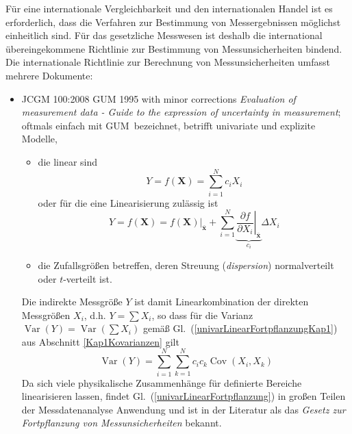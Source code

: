 Für eine internationale Vergleichbarkeit und den internationalen Handel ist es erforderlich,
dass die Verfahren zur Bestimmung von Messergebnissen möglichst einheitlich sind.
Für das gesetzliche Messwesen ist deshalb die international übereingekommene Richtlinie
zur Bestimmung von Messunsicherheiten bindend.
Die internationale Richtlinie zur Berechnung von Messunsicherheiten umfasst mehrere
Dokumente:
\begin{itemize}
\item JCGM 100:2008 GUM 1995 with minor corrections \textsl{Evaluation of measurement
data - Guide to the expression of uncertainty in measurement}; oftmals einfach mit \glqq GUM\grqq ~bezeichnet,
betrifft univariate und explizite Modelle, 
  \begin{itemize}
  \item die linear sind
  \begin{equation}
  Y = f(\mathbf{X}) = \sum_{i=1}^N c_i X_i
  \label{univarLinear}
  \end{equation}
  oder für die eine Linearisierung zulässig ist
  \begin{equation}
  Y = f(\mathbf{X})
  = \left. f(\mathbf{X}) \right|_{\bar{\mathbf{x}}} + 
    \sum_{i=1}^N \underbrace{\left. \frac{\partial f}{\partial X_i} \right|_{\bar{\mathbf{x}}}}_{c_i} \Delta X_i
  \label{univarTaylorLin}
  \end{equation}
  \item die Zufallsgrößen betreffen, deren Streuung (\textsl{dispersion}) normalverteilt oder
  $t$-verteilt ist.
  \end{itemize}
Die indirekte Messgröße $Y$ ist damit Linearkombination der direkten Messgrößen $X_i$, d.h.
$Y = \sum X_i$, so dass für die Varianz $\operatorname{Var}(Y) = \operatorname{Var}(\sum X_i)$
gemäß Gl.~(\ref{univarLinearFortpflanzungKap1}) aus Abschnitt \ref{Kap1Kovarianzen} gilt
\begin{equation}
\operatorname{Var}(Y) = \sum_{i=1}^N \sum_{k=1}^N  c_i c_k \operatorname{Cov}(X_i, X_k)
\label{univarLinearFortpflanzung}
\end{equation}
Da sich viele physikalische Zusammenhänge für definierte Bereiche linearisieren lassen,
findet Gl.~(\ref{univarLinearFortpflanzung}) in großen Teilen der Messdatenanalyse
Anwendung und ist in der Literatur als das \textsl{Gesetz zur Fortpflanzung von Messunsicherheiten}
bekannt.


\end{itemize}
